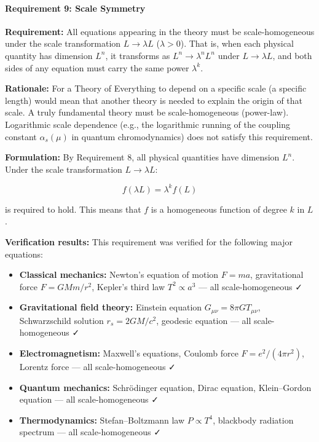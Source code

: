 \documentclass[a4paper,11pt]{article}
\providecommand{\tightlist}{\setlength{\itemsep}{0pt}\setlength{\parskip}{0pt}}
\begin{document}
\paragraph{Requirement 9: Scale
Symmetry}\label{requirement-9-scale-symmetry}

\textbf{Requirement:} All equations appearing in the theory must be
scale-homogeneous under the scale transformation \(L \to \lambda L\)
(\(\lambda > 0\)). That is, when each physical quantity has dimension
\(L^n\), it transforms as \(L^n \to \lambda^n L^n\) under
\(L \to \lambda L\), and both sides of any equation must carry the same
power \(\lambda^k\).

\textbf{Rationale:} For a Theory of Everything to depend on a specific
scale (a specific length) would mean that another theory is needed to
explain the origin of that scale. A truly fundamental theory must be
scale-homogeneous (power-law). Logarithmic scale dependence (e.g., the
logarithmic running of the coupling constant \(\alpha_s(\mu)\) in
quantum chromodynamics) does not satisfy this requirement.

\textbf{Formulation:} By Requirement 8, all physical quantities have
dimension \(L^n\). Under the scale transformation \(L \to \lambda L\):

\[f(\lambda L) = \lambda^k f(L)\]

is required to hold. This means that \(f\) is a homogeneous function of
degree \(k\) in \(L\).

\textbf{Verification results:} This requirement was verified for the
following major equations:

\begin{itemize}
\tightlist
\item
  \textbf{Classical mechanics:} Newton's equation of motion \(F = ma\),
  gravitational force \(F = GMm/r^2\), Kepler's third law
  \(T^2 \propto a^3\) --- all scale-homogeneous ✓
\item
  \textbf{Gravitational field theory:} Einstein equation
  \(G_{\mu\nu} = 8\pi G T_{\mu\nu}\), Schwarzschild solution
  \(r_s = 2GM/c^2\), geodesic equation --- all scale-homogeneous ✓
\item
  \textbf{Electromagnetism:} Maxwell's equations, Coulomb force
  \(F = e^2/(4\pi r^2)\), Lorentz force --- all scale-homogeneous ✓
\item
  \textbf{Quantum mechanics:} Schrödinger equation, Dirac equation,
  Klein--Gordon equation --- all scale-homogeneous ✓
\item
  \textbf{Thermodynamics:} Stefan--Boltzmann law \(P \propto T^4\),
  blackbody radiation spectrum --- all scale-homogeneous ✓
\end{itemize}
\end{document}

